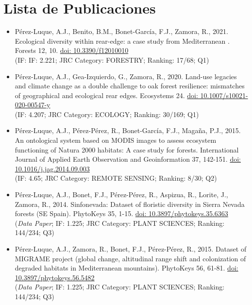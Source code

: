 %
\pagestyle{empty}
\hfill

\section*{Lista de Publicaciones}

\begin{itemize}
    \item Pérez-Luque, A.J., Benito, B.M., Bonet-García, F.J., Zamora, R., 2021. Ecological diversity within rear-edge: a case study from Mediterranean \Qpw. Forests 12, 10. \href{https://doi.org/10.3390/f12010010}{doi: 10.3390/f12010010} \\ 
    (IF: IF: 2.221; JRC Category: FORESTRY; Ranking: 17/68; Q1) 
    \item Pérez-Luque, A.J., Gea-Izquierdo, G., Zamora, R., 2020. Land-use legacies and climate change as a double challenge to oak forest resilience: mismatches of geographical and ecological rear edges. Ecosystems 24. \href{https://doi.org/10.1007/s10021-020-00547-y}{doi: 10.1007/s10021-020-00547-y} \\
    (IF: 4.207; JRC Category: ECOLOGY; Ranking: 30/169; Q1)
    \item Pérez-Luque, A.J., Pérez-Pérez, R., Bonet-García, F.J., Magaña, P.J., 2015. An ontological system based on MODIS images to assess ecosystem functioning of Natura 2000 habitats: A case study for \Qp forests. International Journal of Applied Earth Observation and Geoinformation 37, 142-151. \href{https://doi.org/10.1016/j.jag.2014.09.003}{doi: 10.1016/j.jag.2014.09.003} \\
    (IF: 4.65; JRC Category: REMOTE SENSING; Ranking: 8/30; Q2)
    \item Pérez-Luque, A.J., Bonet, F.J., Pérez-Pérez, R., Aspizua, R., Lorite, J., Zamora, R., 2014. Sinfonevada: Dataset of floristic diversity in Sierra Nevada forests (SE Spain). PhytoKeys 35, 1-15. \href{https://doi.org/10.3897/phytokeys.35.6363}{doi: 10.3897/phytokeys.35.6363}\\
    (\emph{Data Paper}; IF: 1.225; JRC Category: PLANT SCIENCES; Ranking: 144/234; Q3)
    \item Pérez-Luque, A.J., Zamora, R., Bonet, F.J., Pérez-Pérez, R., 2015. Dataset of MIGRAME project (global change, altitudinal range shift and colonization of degraded habitats in Mediterranean mountains). PhytoKeys 56, 61-81. \href{https://doi.org/10.3897/phytokeys.56.5482}{doi: 10.3897/phytokeys.56.5482}\\
    (\emph{Data Paper}; IF: 1.225; JRC Category: PLANT SCIENCES; Ranking: 144/234; Q3)
\end{itemize}




